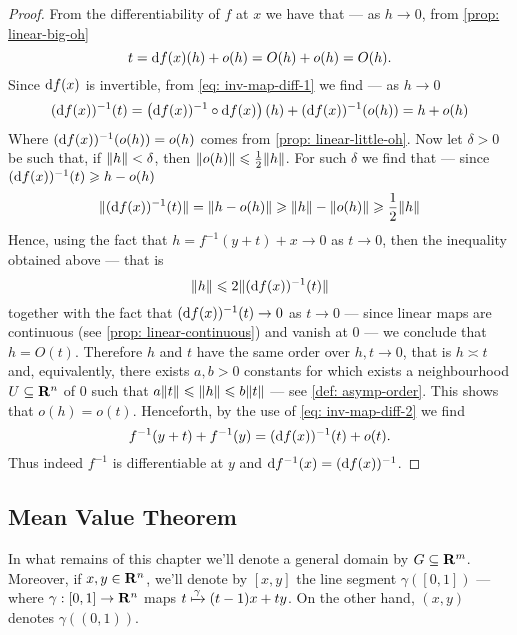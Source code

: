 \begin{proof}
  From the differentiability of \(f\) at \(x\) we have that --- as \(h \to 0\),
  from \cref{prop: linear-big-oh}
  \begin{equation}\label{eq: inv-map-diff-1}
    t = \mathrm{d} f(x)(h) + o(h) = O(h) + o(h) = O(h).
  \end{equation}
  Since \(\mathrm{d} f(x)\) is invertible, from \cref{eq: inv-map-diff-1} we find
  --- as \(h \to 0\)
  \begin{align}\label{eq: inv-map-diff-2}
    (\mathrm{d} f(x))^{-1}(t) = \left( \mathrm{d} f(x))^{-1} \circ \mathrm{d} f(x) \right)(h) +
    (\mathrm{d} f(x))^{-1}(o(h))
    = h + o(h)
  \end{align}
  Where \((\mathrm{d} f(x))^{-1}(o(h)) = o(h)\) comes from \cref{prop:
  linear-little-oh}. Now let \(\delta > 0\) be such that, if \(\lVert h\rVert <
  \delta\), then \(\lVert o(h)\rVert \leqslant \frac 1 2 \lVert h\rVert\). For such
  \(\delta\) we find that --- since \((\mathrm{d} f(x))^{-1}(t) \geqslant h - o(h)\)
  \begin{align*}
    \lVert(\mathrm{d} f(x))^{-1}(t)\rVert
    = \lVert h - o(h)\rVert
    \geqslant \lVert h\rVert - \lVert o(h)\rVert
    \geqslant \frac 1 2 \lVert h\rVert
  \end{align*}
  Hence, using the fact that \(h = f^{-1}(y + t) + x \to 0\) as \(t \to 0\),
  then the inequality obtained above --- that is
  \[
    \lVert h\rVert \leqslant 2 \lVert(\mathrm{d} f(x))^{-1}(t)\rVert
  \]
  together with the fact that \((\mathrm{d} f(x))^{-1}(t) \to 0\) as \(t \to 0\) ---
  since linear maps are continuous (see \cref{prop: linear-continuous}) and
  vanish at \(0\) --- we conclude that \(h = O(t)\). Therefore \(h\) and \(t\)
  have the same order over \(h, t \to 0\), that is \(h \asymp t\) and,
  equivalently, there exists \(a, b > 0\) constants for which exists a
  neighbourhood \(U \subseteq \mathbf{R}^n\) of \(0\) such that \(a \lVert t\rVert \leqslant
  \lVert h\rVert \leqslant b \lVert t\rVert\) --- see \cref{def: asymp-order}. This
  shows that \(o(h) = o(t)\). Henceforth, by the use of \cref{eq:
  inv-map-diff-2} we find
  \[
    f^{-1}(y + t) + f^{-1}(y) = (\mathrm{d} f(x))^{-1}(t) + o(t).
  \]
  Thus indeed \(f^{-1}\) is differentiable at \(y\) and \(\mathrm{d} f^{-1}(x) =
  (\mathrm{d} f(x))^{-1}\).
\end{proof}

\subsection{Mean Value Theorem}

\begin{remark}
  In what remains of this chapter we'll denote a general domain by \(G \subseteq
  \mathbf{R}^m\). Moreover, if \(x, y \in \mathbf{R}^n\), we'll denote by \([x, y]\) the line
  segment \(\gamma([0, 1])\) --- where \(\gamma: [0, 1] \to \mathbf{R}^n\) maps \(t
  \xmapsto \gamma (t - 1) x + t y\). On the other hand, \((x, y)\) denotes
  \(\gamma((0, 1))\).
\end{remark}

